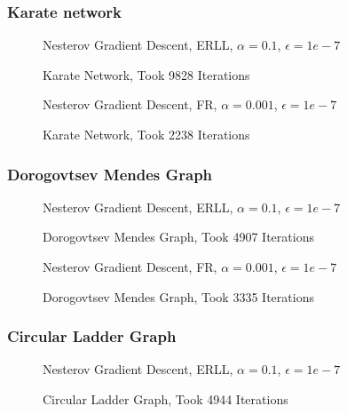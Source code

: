 \documentclass[12pt]{article}
\begin{document}
\subsubsection{Karate network}

\begin{figure}[H]
\centering
Nesterov Gradient Descent, ERLL, $\alpha=0.1$, $\epsilon=1e-7$

\caption{\label{karate-nesterov-erll} Karate Network, Took 9828 Iterations}
\end{figure}

\begin{figure}[H]
\centering
Nesterov Gradient Descent, FR, $\alpha=0.001$, $\epsilon=1e-7$

\caption{\label{karate-nesterov-fr} Karate Network, Took 2238 Iterations}
\end{figure}

\subsubsection{Dorogovtsev Mendes Graph}

\begin{figure}[H]
\centering
Nesterov Gradient Descent, ERLL, $\alpha=0.1$, $\epsilon=1e-7$

\caption{\label{dorogovtsev-mendes-nesterov-erll} Dorogovtsev Mendes Graph, Took 4907 Iterations}
\end{figure}

\begin{figure}[H]
\centering
Nesterov Gradient Descent, FR, $\alpha=0.001$, $\epsilon=1e-7$

\caption{\label{dorogovtsev-mendes-nesterov-fr} Dorogovtsev Mendes Graph, Took 3335 Iterations}
\end{figure}

\subsubsection{Circular Ladder Graph}

\begin{figure}[H]
\centering
Nesterov Gradient Descent, ERLL, $\alpha=0.1$, $\epsilon=1e-7$

\caption{\label{circular-ladder-nesterov-erll} Circular Ladder Graph, Took 4944 Iterations}
\end{figure}
\end{document}
